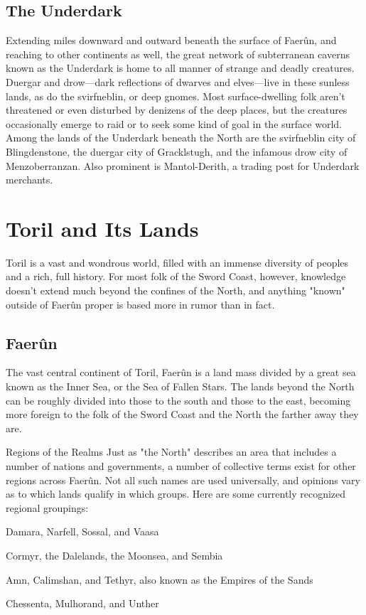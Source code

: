 \documentclass[10pt,a4paper,twoside,twocolumn,openany,bg=print,nodeprecatedcode]{dndbook}
\begin{document}
\subsection{The Underdark}
Extending miles downward and outward beneath the surface of Faerûn, and reaching to other continents as well, the great network of subterranean caverns known as the Underdark is home to all manner of strange and deadly creatures. Duergar and drow—dark reflections of dwarves and elves—live in these sunless lands, as do the svirfneblin, or deep gnomes. Most surface-dwelling folk aren't threatened or even disturbed by denizens of the deep places, but the creatures occasionally emerge to raid or to seek some kind of goal in the surface world.
Among the lands of the Underdark beneath the North are the svirfneblin city of Blingdenstone, the duergar city of Gracklstugh, and the infamous drow city of Menzoberranzan. Also prominent is Mantol-Derith, a trading post for Underdark merchants.
\section{Toril and Its Lands}
Toril is a vast and wondrous world, filled with an immense diversity of peoples and a rich, full history. For most folk of the Sword Coast, however, knowledge doesn't extend much beyond the confines of the North, and anything "known" outside of Faerûn proper is based more in rumor than in fact.
\subsection{Faerûn}
The vast central continent of Toril, Faerûn is a land mass divided by a great sea known as the Inner Sea, or the Sea of Fallen Stars. The lands beyond the North can be roughly divided into those to the south and those to the east, becoming more foreign to the folk of the Sword Coast and the North the farther away they are.
\begin{DndComment}{Regions of the Realms}
Just as "the North" describes an area that includes a number of nations and governments, a number of collective terms exist for other regions across Faerûn. Not all such names are used universally, and opinions vary as to which lands qualify in which groups. Here are some currently recognized regional groupings:

\begin{description}[nolistsep]
\item[The Cold Lands:]
Damara, Narfell, Sossal, and Vaasa
\item[The Heartlands:]
Cormyr, the Dalelands, the Moonsea, and Sembia
\item[The Lands of Intrigue:]
Amn, Calimshan, and Tethyr, also known as the Empires of the Sands
\item[The Old Empires:]
Chessenta, Mulhorand, and Unther
\end{description}

\end{DndComment}
\end{document}
